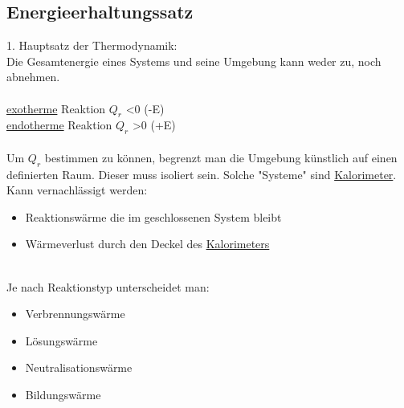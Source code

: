\subsection{Energieerhaltungssatz}
1. Hauptsatz der Thermodynamik: \\
Die Gesamtenergie eines Systems und seine Umgebung kann weder zu, noch abnehmen. \\ \\
\hyperref[sec:endo_exotherm]{exotherme} Reaktion $Q_r$ \textless 0 (-E) \\
\hyperref[sec:endo_exotherm]{endotherme} Reaktion $Q_r$ \textgreater 0 (+E) \\ \\
Um $Q_r$ bestimmen zu können, begrenzt man die Umgebung künstlich auf einen definierten Raum.
Dieser muss isoliert sein.
Solche "Systeme" sind \hyperref[sec:kalorimeter]{Kalorimeter}. \\ 
Kann vernachlässigt werden: \\

\begin{itemize}
    \item Reaktionswärme die im geschlossenen System bleibt
    \item Wärmeverlust durch den Deckel des \hyperref[sec:kalorimeter]{Kalorimeters}
\end{itemize} 
\ \\
Je nach Reaktionstyp unterscheidet man:

\begin{itemize}
    \item Verbrennungswärme
    \item Lösungswärme
    \item Neutralisationswärme
    \item Bildungswärme
\end{itemize}
